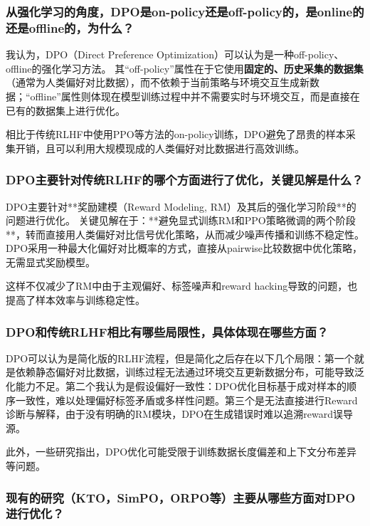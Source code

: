 \documentclass{article}
\begin{document}
\subsubsection{从强化学习的角度，DPO是on-policy还是off-policy的，是online的还是offline的，为什么？}
我认为，DPO（Direct Preference Optimization）可以认为是一种off-policy、offline的强化学习方法。
其“off-policy”属性在于它使用\textbf{固定的、历史采集的数据集}（通常为人类偏好对比数据），而不依赖于当前策略与环境交互生成新数据；“offline”属性则体现在模型训练过程中并不需要实时与环境交互，而是直接在已有的数据集上进行优化。

相比于传统RLHF中使用PPO等方法的on-policy训练，DPO避免了昂贵的样本采集开销，且可以利用大规模现成的人类偏好对比数据进行高效训练\cite{rafailov2023direct}。


\subsubsection{DPO主要针对传统RLHF的哪个方面进行了优化，关键见解是什么？}

DPO主要针对**奖励建模（Reward Modeling, RM）及其后的强化学习阶段**的问题进行优化。
关键见解在于：**避免显式训练RM和PPO策略微调的两个阶段**，转而直接用人类偏好对比信号优化策略，从而减少噪声传播和训练不稳定性。DPO采用一种最大化偏好对比概率的方式，直接从pairwise比较数据中优化策略，无需显式奖励模型\cite{rafailov2023direct}。

这样不仅减少了RM中由于主观偏好、标签噪声和reward hacking导致的问题，也提高了样本效率与训练稳定性。



\subsubsection{DPO和传统RLHF相比有哪些局限性，具体体现在哪些方面？}

DPO可以认为是简化版的RLHF流程，但是简化之后存在以下几个局限：第一个就是依赖静态偏好对比数据，训练过程无法通过环境交互更新数据分布，可能导致泛化能力不足。第二个我认为是假设偏好一致性：DPO优化目标基于成对样本的顺序一致性，难以处理偏好标签矛盾或多样性问题。第三个是无法直接进行Reward诊断与解释，由于没有明确的RM模块，DPO在生成错误时难以追溯reward误导源。

此外，一些研究指出，DPO优化可能受限于训练数据长度偏差和上下文分布差异等问题\cite{rafailov2023direct}。

\subsubsection{现有的研究（KTO，SimPO，ORPO等）主要从哪些方面对DPO进行优化？}
\end{document}
